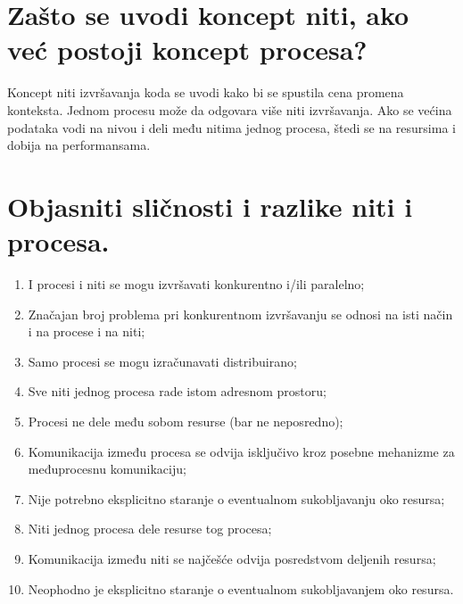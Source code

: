 \documentclass[a4paper]{article}
\begin{document}
\section{Zašto se uvodi koncept niti, ako već postoji koncept procesa?}
  Koncept niti izvršavanja koda se uvodi kako bi se spustila cena promena konteksta. 
  Jednom procesu može da odgovara više niti izvršavanja. Ako se većina podataka vodi na nivou i deli 
  među nitima jednog procesa, štedi se na resursima i dobija na performansama.

\section{Objasniti sličnosti i razlike niti i procesa.}
  \begin{enumerate}
    \item I procesi i niti se mogu izvršavati konkurentno i/ili paralelno;
    \item Značajan broj problema pri konkurentnom izvršavanju se odnosi na isti način 
          i na procese i na niti;
    \item Samo procesi se mogu izračunavati distribuirano;
    \item Sve niti jednog procesa rade istom adresnom prostoru;
    \item Procesi ne dele među sobom resurse (bar ne neposredno);
    \item Komunikacija između procesa se odvija isključivo kroz posebne mehanizme za 
          međuprocesnu komunikaciju;
    \item Nije potrebno eksplicitno staranje o eventualnom sukobljavanju oko resursa;
    \item Niti jednog procesa dele resurse tog procesa;
    \item Komunikacija između niti se najčešće odvija posredstvom deljenih resursa;
    \item Neophodno je eksplicitno staranje o eventualnom sukobljavanjem oko resursa.
  \end{enumerate}
  
\end{document}
